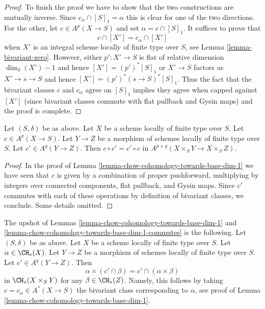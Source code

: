 \begin{proof}
\medskip\noindent
To finish the proof we have to show that the two constructions
are mutually inverse. Since $c_\alpha \cap [S]_1 = \alpha$
this is clear for one of the two directions. For the other, let
$c \in A^p(X \to S)$ and set $\alpha = c \cap [S]_1$.
It suffices to prove that
$$
c \cap [X'] = c_\alpha \cap [X']
$$
when $X'$ is an integral scheme locally of finite type over $S$,
see Lemma \ref{lemma-bivariant-zero}. However, either $p' : X' \to S$
is flat of relative dimension $\dim_\delta(X') - 1$ and hence
$[X'] = (p')^*[S]_1$ or $X' \to S$ factors as $X' \to s \to S$
and hence $[X'] = (p')^*(s \to S)^*[S]_1$. Thus the fact that the
bivariant classes $c$ and $c_\alpha$ agree on $[S]_1$
implies they agree when capped against $[X']$ (since bivariant classes
commute with flat pullback and Gysin maps) and the proof is complete.
\end{proof}

\begin{lemma}
\label{lemma-chow-cohomology-towards-base-dim-1-commutes}
Let $(S, \delta)$ be as above. Let $X$ be a scheme locally of finite type
over $S$. Let $c \in A^p(X \to S)$. Let $Y \to Z$ be a morphism of schemes
locally of finite type over $S$. Let $c' \in A^q(Y \to Z)$. Then
$c \circ c' = c' \circ c$ in $A^{p + q}(X \times_S Y \to X \times_S Z)$.
\end{lemma}

\begin{proof}
In the proof of Lemma \ref{lemma-chow-cohomology-towards-base-dim-1}
we have seen that $c$ is given by a combination of
proper pushforward, multiplying by integers over connected
components, flat pullback, and Gysin maps. Since $c'$ commutes with each of
these operations by definition of bivariant classes, we conclude.
Some details omitted.
\end{proof}

\begin{remark}
\label{remark-commuting-exterior-dim-1}
The upshot of Lemmas \ref{lemma-chow-cohomology-towards-base-dim-1}
and \ref{lemma-chow-cohomology-towards-base-dim-1-commutes} is the following.
Let $(S, \delta)$ be as above. Let $X$ be a scheme locally of finite type
over $S$.
Let $\alpha \in \CH_*(X)$. Let $Y \to Z$ be a morphism of schemes
locally of finite type over $S$. Let $c' \in A^q(Y \to Z)$. Then
$$
\alpha \times (c' \cap \beta) = c' \cap (\alpha \times \beta)
$$
in $\CH_*(X \times_S Y)$ for any $\beta \in \CH_*(Z)$. Namely, this
follows by taking $c = c_\alpha \in A^*(X \to S)$ the bivariant class
corresponding to $\alpha$, see proof of
Lemma \ref{lemma-chow-cohomology-towards-base-dim-1}.
\end{remark}

